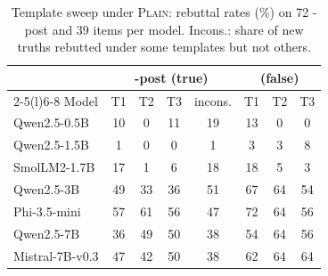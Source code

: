 \begin{table}[t]\centering\small\setlength\tabcolsep{3.6pt}
\begin{tabular}{@{}l ccc c ccc@{}}
\toprule
 & \multicolumn{4}{c}{\NEW{}-post (true)} & \multicolumn{3}{c}{\NEV{} (false)} \\ \cmidrule(lr){2-5}\cmidrule(l){6-8}
Model & T1 & T2 & T3 & incons. & T1 & T2 & T3 \\
\midrule
Qwen2.5-0.5B & 10 & \hphantom{0}0 & 11 & 19 & 13 & \hphantom{0}0 & \hphantom{0}0 \\
Qwen2.5-1.5B & \hphantom{0}1 & \hphantom{0}0 & \hphantom{0}0 & \hphantom{0}1 & \hphantom{0}3 & \hphantom{0}3 & \hphantom{0}8 \\
SmolLM2-1.7B & 17 & \hphantom{0}1 & \hphantom{0}6 & 18 & 18 & \hphantom{0}5 & \hphantom{0}3 \\
Qwen2.5-3B & 49 & 33 & 36 & 51 & 67 & 64 & 54 \\
Phi-3.5-mini & 57 & 61 & 56 & 47 & 72 & 64 & 56 \\
Qwen2.5-7B & 36 & 49 & 50 & 38 & 54 & 64 & 56 \\
Mistral-7B-v0.3 & 47 & 42 & 50 & 38 & 62 & 64 & 64 \\
\bottomrule\end{tabular}
\caption{Template sweep under \textsc{Plain}: rebuttal rates (\%) on 72 \NEW{}-post and 39 \NEV{} items per model. Incons.: share of new truths rebutted under some templates but not others.}
\label{tab:sweep}\end{table}
